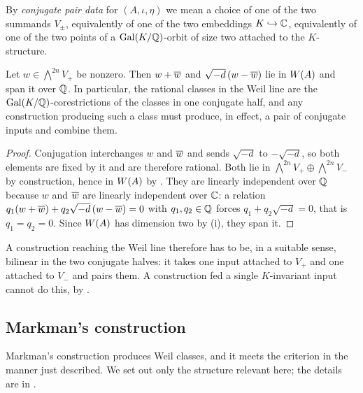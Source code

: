 \begin{definition}\label{def:conjpair}
By \emph{conjugate pair data} for $(A,\iota,\eta)$ we mean a choice of one of
the two summands $V_{\pm}$, equivalently of one of the two embeddings
$K\hookrightarrow\mathbb{C}$, equivalently of one of the two points of a
$\operatorname{Gal}(K/\mathbb{Q})$-orbit of size two attached to the $K$-structure.
\end{definition}

\begin{proposition}\label{prop:corestriction}
Let $w\in\bigwedge^{2n}V_{+}$ be nonzero. Then $w+\overline{w}$ and
$\sqrt{-d}\,(w-\overline{w})$ lie in $W(A)$ and span it over $\mathbb{Q}$. In
particular, the rational classes in the Weil line are the
$\operatorname{Gal}(K/\mathbb{Q})$-corestrictions of the classes in one conjugate half, and any
construction producing such a class must produce, in effect, a pair of
conjugate inputs and combine them.
\end{proposition}

\begin{proof}
Conjugation interchanges $w$ and $\overline{w}$ and sends $\sqrt{-d}$ to
$-\sqrt{-d}$, so both elements are fixed by it and are therefore rational.
Both lie in $\bigwedge^{2n}V_{+}\oplus\bigwedge^{2n}V_{-}$ by construction,
hence in $W(A)$ by . They are linearly independent over
$\mathbb{Q}$ because $w$ and $\overline{w}$ are linearly independent over $\mathbb{C}$: a
relation $q_{1}(w+\overline{w})+q_{2}\sqrt{-d}\,(w-\overline{w})=0$ with
$q_{1},q_{2}\in\mathbb{Q}$ forces $q_{1}+q_{2}\sqrt{-d}=0$, that is $q_{1}=q_{2}=0$.
Since $W(A)$ has dimension two by (i), they span it.
\end{proof}

A construction reaching the Weil line therefore has to be, in a suitable
sense, bilinear in the two conjugate halves: it takes one input attached to
$V_{+}$ and one attached to $V_{-}$ and pairs them. A construction fed a
single $K$-invariant input cannot do this, by .

\subsection{Markman's construction}

Markman's construction \cite{Mar25a,Mar25b} produces Weil classes, and it
meets the criterion in the manner just described. We set out only the
structure relevant here; the details are in \cite{Mar25b}.

